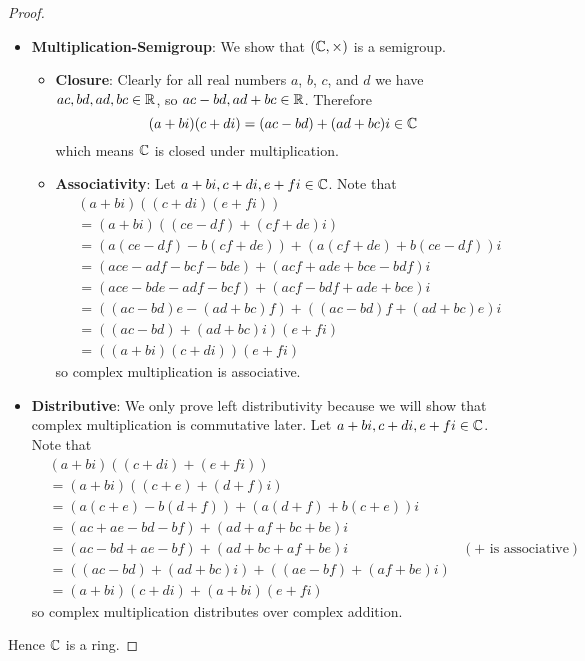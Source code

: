 \begin{proof}
\begin{itemize}
        \item \textbf{Multiplication-Semigroup}: We show that $(\mathbb{C}, \times)$ is a semigroup.
        \begin{itemize}
            \item \textbf{Closure}: Clearly for all real numbers $a$, $b$, $c$, and $d$ we have $ac, bd, ad, bc \in \mathbb{R}$, so $ac - bd, ad + bc \in \mathbb{R}$. Therefore
            \[
                (a+bi)(c+di) = (ac-bd) + (ad+bc)i \in \mathbb{C}
            \]
            which means $\mathbb{C}$ is closed under multiplication.

            \item \textbf{Associativity}: Let $a+bi, c+di, e+fi \in \mathbb{C}$. Note that
            \begin{align*}
                &(a+bi)((c+di)(e+fi))\\
                &= (a+bi)((ce-df)+(cf+de)i)\\
                &= (a(ce-df) - b(cf+de)) + (a(cf+de) + b(ce-df))i\\
                &= (ace - adf - bcf - bde) + (acf + ade + bce - bdf)i\\
                &= (ace - bde - adf - bcf) + (acf - bdf + ade + bce)i\\
                &= ((ac-bd)e - (ad+bc)f) + ((ac-bd)f + (ad+bc)e)i\\
                &= ((ac-bd)+(ad+bc)i)(e+fi)\\
                &= ((a+bi)(c+di))(e+fi)
            \end{align*}
            so complex multiplication is associative.
        \end{itemize}
        
        \item \textbf{Distributive}: We only prove left distributivity because we will show that complex multiplication is commutative later. Let $a+bi, c+di, e+fi \in \mathbb{C}$. Note that
        \begin{align*}
            &(a+bi)((c+di) + (e+fi))\\
            &= (a+bi)((c+e) + (d+f)i)\\
            &= (a(c+e)-b(d+f)) + (a(d+f) + b(c+e))i\\
            &= (ac+ae-bd-bf) + (ad+af+bc+be)i\\
            &= (ac-bd+ae-bf) + (ad+bc+af+be)i & (+ \text{ is associative})\\
            &= ((ac-bd) + (ad+bc)i) + ((ae - bf) + (af + be)i)\\
            &= (a+bi)(c+di) + (a+bi)(e+fi)
        \end{align*}
        so complex multiplication distributes over complex addition.
    \end{itemize}
    Hence $\mathbb{C}$ is a ring.
    

\end{proof}

